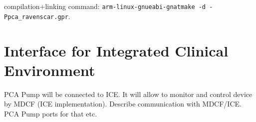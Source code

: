 compilation+linking command: \lstinline{arm-linux-gnueabi-gnatmake -d -Ppca_ravenscar.gpr}.




\section{Interface for Integrated Clinical Environment}
\label{pcapump:implementation:ice}

PCA Pump will be connected to ICE. It will allow to monitor and control device by MDCF (ICE implementation).
Describe communication with MDCF/ICE. PCA Pump ports for that etc.